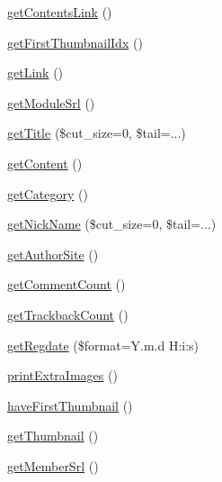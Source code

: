 \begin{DoxyCompactItemize}
\hyperlink{classcontentItem_a80a161de842f1a890fdbfee439674881}{get\+Contents\+Link} ()
\item 
\hyperlink{classcontentItem_a0de8d1dad2347b9f91bc4f16df2c4a12}{get\+First\+Thumbnail\+Idx} ()
\item 
\hyperlink{classcontentItem_a8e5d8c09bab20f5a0cd0874504cf5a5e}{get\+Link} ()
\item 
\hyperlink{classcontentItem_a62686ab7afb76f1239a3824be0e2ded8}{get\+Module\+Srl} ()
\item 
\hyperlink{classcontentItem_aa061be1a76a2d94912440572bd4f875a}{get\+Title} (\$cut\+\_\+size=0, \$tail=\textquotesingle{}...\textquotesingle{})
\item 
\hyperlink{classcontentItem_adb35fd4206e162bccd6ff9f5ac832e09}{get\+Content} ()
\item 
\hyperlink{classcontentItem_ae5a4e97f8f472805fff31340bc095ff3}{get\+Category} ()
\item 
\hyperlink{classcontentItem_a16947acbbeff208471271acd16d5f8f1}{get\+Nick\+Name} (\$cut\+\_\+size=0, \$tail=\textquotesingle{}...\textquotesingle{})
\item 
\hyperlink{classcontentItem_ac8050edaeafe9d6a9c3017185a60576d}{get\+Author\+Site} ()
\item 
\hyperlink{classcontentItem_ae2402a7138ef2a2c9dae2d76aa31228f}{get\+Comment\+Count} ()
\item 
\hyperlink{classcontentItem_a197f56732733f1487d26ed23d29e94a6}{get\+Trackback\+Count} ()
\item 
\hyperlink{classcontentItem_aae303f7b7e5c67302f42f9d9c67b89c2}{get\+Regdate} (\$format=\textquotesingle{}Y.\+m.\+d H\+:i\+:s\textquotesingle{})
\item 
\hyperlink{classcontentItem_acdff242f3298021a7ac9274a4191ebc7}{print\+Extra\+Images} ()
\item 
\hyperlink{classcontentItem_a9e7fa4b2b4b3ce4a066d89b7f862be5a}{have\+First\+Thumbnail} ()
\item 
\hyperlink{classcontentItem_a2d0ac2755de034bee02842e1b4b8179c}{get\+Thumbnail} ()
\item 
\hyperlink{classcontentItem_a3356fefc2abd34642fa229f5a150cbdd}{get\+Member\+Srl} ()
\end{DoxyCompactItemize}
